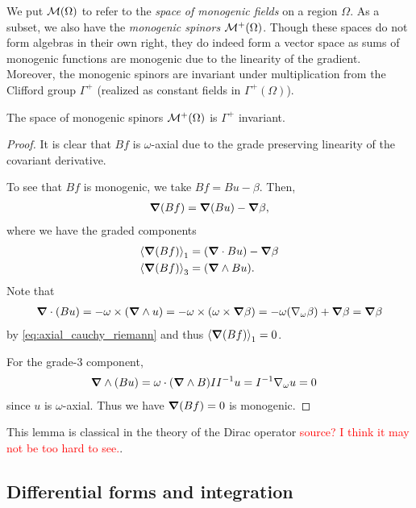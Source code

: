 We put $\monogenics(\Omega)$ to refer to the \emph{space of monogenic fields} on a region $\Omega$. As a subset, we also have the \emph{monogenic spinors} $\monogenics^+(\Omega)$. Though these spaces do not form algebras in their own right, they do indeed form a vector space as sums of monogenic functions are monogenic due to the linearity of the gradient.  Moreover, the monogenic spinors are invariant under multiplication from the Clifford group $\Gamma^+$ (realized as constant fields in $\Gamma^+(\Omega)$).

\begin{lemma}
\label{lem:clifford_invariant}
The space of monogenic spinors $\monogenics^+(\Omega)$ is $\Gamma^+$ invariant.
\end{lemma}
\begin{proof}
    It is clear that $B f$ is $\omega$-axial due to the grade preserving linearity of the covariant derivative.
    
    To see that $B f$ is monogenic, we take $B  f = B  u - \beta$.  Then,
    \begin{align*}
    \grad (Bf) = \grad (B u) - \grad \beta,
    \end{align*}
    where we have the graded components
    \begin{align*}
        \proj{1}{\grad (B f)} &= (\grad \cdot Bu)  - \grad \beta\\
        \proj{3}{\grad (Bf)} &= (\grad \wedge B u).
    \end{align*}
    Note that
    \begin{align*}
    \grad \cdot (Bu) =  -\omega \times (\grad \wedge u)  =- \omega \times (\omega \times \grad\beta) = -\omega (\nabla_\omega \beta)+\grad \beta = \grad \beta
    \end{align*}
    by \ref{eq:axial_cauchy_riemann} and thus $\proj{1}{\grad (Bf)}=0$. 
    
    For the grade-3 component,
    \begin{align*}
        \grad \wedge (B u) &= \omega \cdot  (\grad \wedge B)II^{-1}u = I^{-1} \nabla_\omega u=0
    \end{align*}
    since $u$ is $\omega$-axial. Thus we have $\grad(B f)=0$ is monogenic.
\end{proof}
This lemma is classical in the theory of the Dirac operator \textcolor{red}{source? I think it may not be too hard to see.}.


\subsection{Differential forms and integration}

